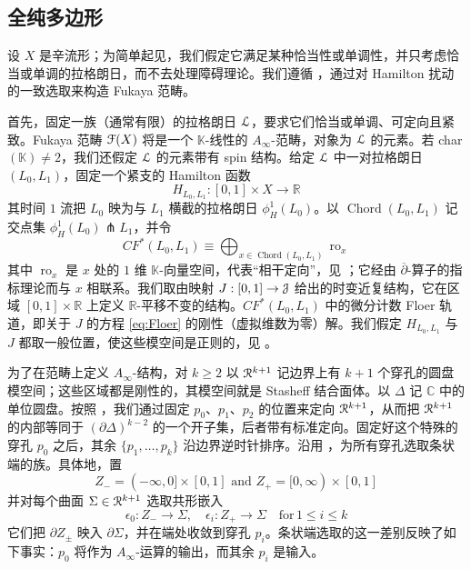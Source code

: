 \documentclass[11pt,a4paper]{article}
\numberwithin{equation}{section}
\newcommand{\bR}{\mathbb{R}}
\newcommand{\bC}{\mathbb{C}}
\newcommand{\bK}{\mathbb{K}}
\newcommand{\scrL}{\EuScript{L}}
\newcommand{\scrF}{\EuScript{F}}
\newcommand{\scrJ}{\EuScript{J}}
\newcommand{\scrR}{\EuScript{R}}
\newcommand{\Chord}{\operatorname{Chord}}
\newcommand{\ro}{\operatorname{ro}}
\begin{document}
\subsection{全纯多边形}

设 $X$ 是辛流形；为简单起见，我们假定它满足某种恰当性或单调性，并只考虑恰当或单调的拉格朗日，而不去处理障碍理论。我们遵循 \cite{FCPLT, Sheridan3}，通过对 Hamilton 扰动的一致选取来构造 Fukaya 范畴。

首先，固定一族（通常有限）的拉格朗日 $\scrL$，要求它们恰当或单调、可定向且紧致。Fukaya 范畴 $\scrF(X)$ 将是一个 $\bK$-线性的 $A_{\infty}$-范畴，对象为 $\scrL$ 的元素。若 char$(\bK)\neq 2$，我们还假定 $\scrL$ 的元素带有 spin 结构。给定 $\scrL$ 中一对拉格朗日 $(L_0, L_1)$，固定一个紧支的 Hamilton 函数
\begin{equation}
  H_{L_0,L_1} :  [0,1] \times X \rightarrow \bR
\end{equation}
其时间 $1$ 流把 $L_0$ 映为与 $L_1$ 横截的拉格朗日 $\phi_H^1(L_0)$。以 $\Chord(L_0,L_1)$ 记交点集 $\phi_H^1(L_0) \pitchfork L_1$，并令
\begin{equation}
  CF^*(L_0,L_1) \equiv \bigoplus_{x \in \Chord(L_0,L_1)}  \ro_{x}
\end{equation}
其中 $\ro_x$ 是 $x$ 处的 $1$ 维 $\bK$-向量空间，代表“相干定向”，见 \cite[Section 11h]{FCPLT}；它经由 $\overline{\partial}$-算子的指标理论而与 $x$ 相联系。我们取由映射 $J: [0,1] \rightarrow \scrJ$ 给出的时变近复结构，它在区域 $[0,1] \times \bR$ 上定义 $\bR$-平移不变的结构。$CF^*(L_0,L_1)$ 中的微分计数 Floer 轨道，即关于 $J$ 的方程 \eqref{eq:Floer} 的刚性（虚拟维数为零）解。我们假定 $H_{L_0,L_1}$ 与 $J$ 都取一般位置，使这些模空间是正则的，见 \cite{FHS}。

为了在范畴上定义 $A_{\infty}$-结构，对 $k\geq 2$ 以 $\scrR^{k+1}$ 记边界上有 $k+1$ 个穿孔的圆盘模空间；这些区域都是刚性的，其模空间就是 Stasheff 结合面体。以 $\Delta$ 记 $\bC$ 中的单位圆盘。按照 \cite[Section 12g]{FCPLT}，我们通过固定 $p_0$、$p_1$、$p_2$ 的位置来定向 $\scrR^{k+1}$，从而把 $\scrR^{k+1}$ 的内部等同于 $(\partial \Delta)^{k-2}$ 的一个开子集，后者带有标准定向。固定好这个特殊的穿孔 $p_0$ 之后，其余 $\{p_1,\ldots, p_k\}$ 沿边界逆时针排序。沿用 \cite[Section 9g]{FCPLT}，为所有穿孔选取条状端的族。具体地，置
\begin{equation} \label{eqn:in-out-striplike-ends}
  Z_- = (-\infty,0] \times [0,1] \textrm{ and } Z_+ = [0,\infty) \times [0,1]
\end{equation}
并对每个曲面 $\Sigma \in \scrR^{k+1}$ 选取共形嵌入
\begin{equation}
\epsilon_{0}: Z_- \rightarrow \Sigma, \quad \epsilon_i: Z_+ \rightarrow \Sigma \quad  \textrm{for} \, 1 \leq i \leq k\end{equation}
它们把 $\partial Z_{\pm}$ 映入 $\partial \Sigma$，并在端处收敛到穿孔 $p_i$。条状端选取的这一差别反映了如下事实：$p_0$ 将作为 $A_{\infty}$-运算的输出，而其余 $p_i$ 是输入。
\end{document}

